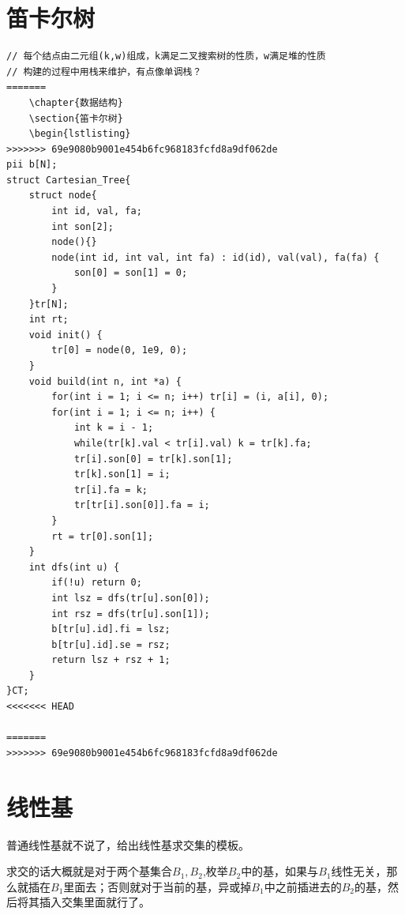\documentclass[a4paper,11pt,twoside,fontset = fandol,UTF8]{ctexbook} %
\begin{document}
	\section{笛卡尔树}
	\begin{lstlisting}
// 每个结点由二元组(k,w)组成，k满足二叉搜索树的性质，w满足堆的性质
// 构建的过程中用栈来维护，有点像单调栈？
=======
	\chapter{数据结构}
	\section{笛卡尔树}
	\begin{lstlisting}
>>>>>>> 69e9080b9001e454b6fc968183fcfd8a9df062de
pii b[N];
struct Cartesian_Tree{
    struct node{
        int id, val, fa;
        int son[2];
        node(){}
        node(int id, int val, int fa) : id(id), val(val), fa(fa) {
            son[0] = son[1] = 0;
        }
    }tr[N];
    int rt;
    void init() {
        tr[0] = node(0, 1e9, 0);
    }
    void build(int n, int *a) {
        for(int i = 1; i <= n; i++) tr[i] = (i, a[i], 0);
        for(int i = 1; i <= n; i++) {
            int k = i - 1;
            while(tr[k].val < tr[i].val) k = tr[k].fa;
            tr[i].son[0] = tr[k].son[1];
            tr[k].son[1] = i;
            tr[i].fa = k;
            tr[tr[i].son[0]].fa = i;
        }
        rt = tr[0].son[1];
    }
    int dfs(int u) {
        if(!u) return 0;
        int lsz = dfs(tr[u].son[0]);
        int rsz = dfs(tr[u].son[1]);
        b[tr[u].id].fi = lsz;
        b[tr[u].id].se = rsz;
        return lsz + rsz + 1;
    }
}CT; 
<<<<<<< HEAD

=======
>>>>>>> 69e9080b9001e454b6fc968183fcfd8a9df062de
	\end{lstlisting}
	\section{线性基}
	普通线性基就不说了，给出线性基求交集的模板。
	
	求交的话大概就是对于两个基集合$B_1,B_2$,枚举$B_2$中的基，如果与$B_1$线性无关，那么就插在$B_1$里面去；否则就对于当前的基，异或掉$B_1$中之前插进去的$B_2$的基，然后将其插入交集里面就行了。
	
\end{document}
